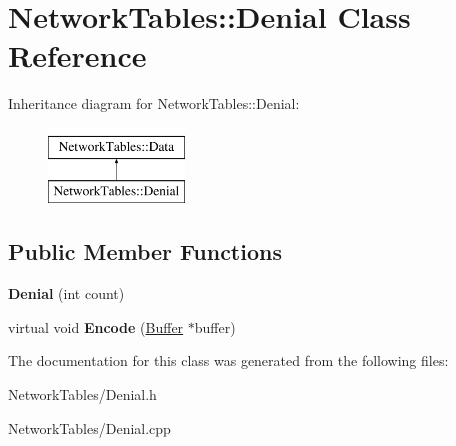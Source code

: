\hypertarget{classNetworkTables_1_1Denial}{
\section{NetworkTables::Denial Class Reference}
\label{classNetworkTables_1_1Denial}
}
Inheritance diagram for NetworkTables::Denial:\begin{figure}[H]
\begin{center}
\leavevmode
\includegraphics[height=2.000000cm]{classNetworkTables_1_1Denial}
\end{center}
\end{figure}
\subsection*{Public Member Functions}
\begin{DoxyCompactItemize}
\item 
\hypertarget{classNetworkTables_1_1Denial_a3c786e3e2d3c441dfa1d9aa66843024d}{
{\bfseries Denial} (int count)}
\label{classNetworkTables_1_1Denial_a3c786e3e2d3c441dfa1d9aa66843024d}

\item 
\hypertarget{classNetworkTables_1_1Denial_a68ca3d7245455dfcf30173746180c75b}{
virtual void {\bfseries Encode} (\hyperlink{classNetworkTables_1_1Buffer}{Buffer} $\ast$buffer)}
\label{classNetworkTables_1_1Denial_a68ca3d7245455dfcf30173746180c75b}

\end{DoxyCompactItemize}


The documentation for this class was generated from the following files:\begin{DoxyCompactItemize}
\item 
NetworkTables/Denial.h\item 
NetworkTables/Denial.cpp\end{DoxyCompactItemize}
